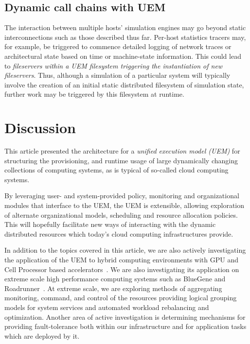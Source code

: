 \documentclass{sig-alternate}
\begin{document}
\subsection{Dynamic call chains with UEM}
The interaction between multiple hosts' simulation engines may go
beyond static interconnections such as those described thus far.  Per-host statistics tracers
may, for example, be triggered to commence detailed logging of
network traces or architectural state based on time or machine-state
information. This could lead to {\it fileservers within a UEM filesystem
triggering the instantiation of new fileservers}. Thus, although a
simulation of a particular system will typically involve the creation
of an initial static distributed filesystem of simulation state,
further work may be triggered by this filesystem at runtime.  

\section{Discussion}
This article presented the architecture for a {\it unified execution model (UEM)} for structuring the provisioning, and runtime usage of large dynamically
changing collections of computing systems, as is typical of so-called
cloud computing systems.

By leveraging user- and system-provided policy, monitoring  and organizational 
modules that interface to the UEM, the UEM is extensible, allowing exploration of alternate 
organizational models, scheduling and resource allocation policies. This will hopefully 
facilitate new ways of interacting with the dynamic distributed resources 
which today's cloud computing infrastructures provide.

In addition to the topics covered in this article, we are also actively
investigating the application of the UEM to hybrid computing environments
with GPU and Cell Processor based accelerators~\cite{evh2009ppac}. 
We are also investigating its application on extreme scale high performance 
computing systems such as BlueGene and Roadrunner~\cite{evh08hare}.
At extreme scale, we are exploring methods of aggregating monitoring, 
command, and control of the resources providing logical grouping models for
system services and automated workload rebalancing and optimization.
Another area of active investigation is determining
mechanisms for providing fault-tolerance both within our infrastructure and
for application tasks which are deployed by it.
\end{document}
